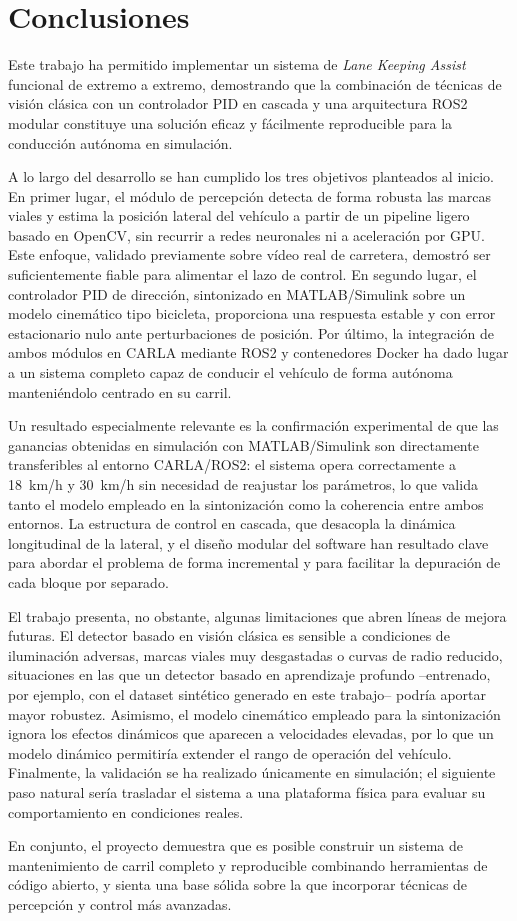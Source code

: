 \documentclass[12pt, a4paper]{article}
\begin{document}
\section{Conclusiones}

Este trabajo ha permitido implementar un sistema de \textit{Lane Keeping Assist} funcional de extremo a extremo, demostrando que la combinación de técnicas de visión clásica con un controlador PID en cascada y una arquitectura ROS2 modular constituye una solución eficaz y fácilmente reproducible para la conducción autónoma en simulación.

A lo largo del desarrollo se han cumplido los tres objetivos planteados al inicio. En primer lugar, el módulo de percepción detecta de forma robusta las marcas viales y estima la posición lateral del vehículo a partir de un pipeline ligero basado en OpenCV, sin recurrir a redes neuronales ni a aceleración por GPU. Este enfoque, validado previamente sobre vídeo real de carretera, demostró ser suficientemente fiable para alimentar el lazo de control. En segundo lugar, el controlador PID de dirección, sintonizado en MATLAB/Simulink sobre un modelo cinemático tipo bicicleta, proporciona una respuesta estable y con error estacionario nulo ante perturbaciones de posición. Por último, la integración de ambos módulos en CARLA mediante ROS2 y contenedores Docker ha dado lugar a un sistema completo capaz de conducir el vehículo de forma autónoma manteniéndolo centrado en su carril.

Un resultado especialmente relevante es la confirmación experimental de que las ganancias obtenidas en simulación con MATLAB/Simulink son directamente transferibles al entorno CARLA/ROS2: el sistema opera correctamente a 18~km/h y 30~km/h sin necesidad de reajustar los parámetros, lo que valida tanto el modelo empleado en la sintonización como la coherencia entre ambos entornos. La estructura de control en cascada, que desacopla la dinámica longitudinal de la lateral, y el diseño modular del software han resultado clave para abordar el problema de forma incremental y para facilitar la depuración de cada bloque por separado.

El trabajo presenta, no obstante, algunas limitaciones que abren líneas de mejora futuras. El detector basado en visión clásica es sensible a condiciones de iluminación adversas, marcas viales muy desgastadas o curvas de radio reducido, situaciones en las que un detector basado en aprendizaje profundo --entrenado, por ejemplo, con el dataset sintético generado en este trabajo-- podría aportar mayor robustez. Asimismo, el modelo cinemático empleado para la sintonización ignora los efectos dinámicos que aparecen a velocidades elevadas, por lo que un modelo dinámico permitiría extender el rango de operación del vehículo. Finalmente, la validación se ha realizado únicamente en simulación; el siguiente paso natural sería trasladar el sistema a una plataforma física para evaluar su comportamiento en condiciones reales.

En conjunto, el proyecto demuestra que es posible construir un sistema de mantenimiento de carril completo y reproducible combinando herramientas de código abierto, y sienta una base sólida sobre la que incorporar técnicas de percepción y control más avanzadas.
\end{document}
